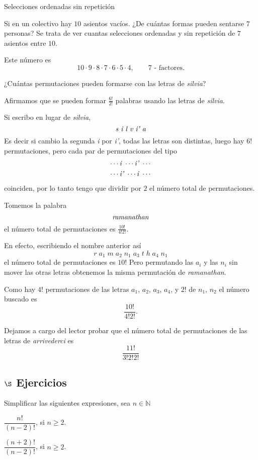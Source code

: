\begin{section}{Selecciones ordenadas sin repetición}
\begin{ejemplo*}
Si en un colectivo hay $10$ asientos vacíos. ¿De cuántas formas
pueden sentarse $7$ personas? Se trata de ver cuantas selecciones ordenadas y sin repetición de $7$ asientos entre $10$. 

Este número es
$$
10 \cdot 9 \cdot 8 \cdot 7 \cdot 6 \cdot 5 \cdot 4, \qquad \text{$7$ - factores.}
$$
\end{ejemplo*}


\begin{ejemplo*}
¿Cuántas permutaciones pueden formarse con las letras de
{\em silvia}?

Afirmamos que se pueden formar  $\displaystyle{\frac{6!}{2!}}$ palabras usando las letras de {\em silvia}.

Si escribo en lugar de {\em silvia},
$$
\text{\em s i l v i' a}
$$
Es decir si cambio la segunda {\em i } por {\em i'}, todas las letras son distintas, luego hay $6!$ permutaciones, pero
cada par de permutaciones del tipo
\begin{align*}
\cdots \text{\em i } \cdots  \text{\em i' }  \cdots \\
\cdots \text{\em i' } \cdots  \text{\em i } \cdots
\end{align*}
coinciden, por lo tanto tengo que dividir por $2$ el número total de permutaciones.

Tomemos la palabra
$$
\text{\em ramanathan}
$$
el número total de permutaciones es $\displaystyle{\frac{10!}{ 4!2!}}$.

En efecto, escribiendo el nombre anterior así 
$$
r\;a_1\;m\;a_2\;n_1\;a_3\;t\;h\;a_4\;n_1
$$
el número total de permutaciones es $10!$ Pero
permutando las $a_i$ y las $n_i$ sin mover las otras letras obtenemos
la misma permutación de {\em ramanathan}.

Como hay $4!$ permutaciones de las letras $a_1$, $a_2$, $a_3$, $a_4$, y
$2!$ de $n_1$, $n_2$ el número buscado es 
$$
\frac{10!}{ 4!2!}.
$$

Dejamos a cargo del lector probar que el número total de
permutaciones de las letras de {\em a\-rri\-ve\-der\-ci} es
$$
\frac{11!}{3!  2!  2!}  
$$
\end{ejemplo*}


\subsection*{$\S$ Ejercicios}

\begin{enumex}
    \item Simplificar las siguientes expresiones, sea $n \in \mathbb N$
    \begin{enumex}
        \begin{minipage}{0.45\textwidth}
            \item $\dfrac{n!}{( n - 2 ) !}$, \; si $n \geq 2$.
        \end{minipage}
        \begin{minipage}{0.40\textwidth}
            \item $ \dfrac{(n + 2)!}{( n - 2 ) !}$, \; si $n \geq 2$.
        \end{minipage}
        

\end{enumex}
\end{enumex}
\end{section}
